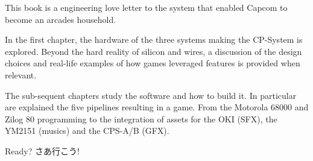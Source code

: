 This book is a engineering love letter to the system that enabled Capcom to become an arcades household.

In the first chapter, the hardware of the three systems making the CP-System is explored. Beyond the hard reality of silicon and wires, a discussion of the design choices and real-life examples of how games leveraged features is provided when relevant.

The sub-sequent chapters study the software and how to build it. In particular are explained the five pipelines resulting in a game. From the Motorola 68000 and Zilog 80 programming to the integration of assets for the OKI (SFX), the YM2151 (musics) and the CPS-A/B (GFX).


\begin{CJK}{UTF8}{min}
Ready? さあ行こう!
\end{CJK}

